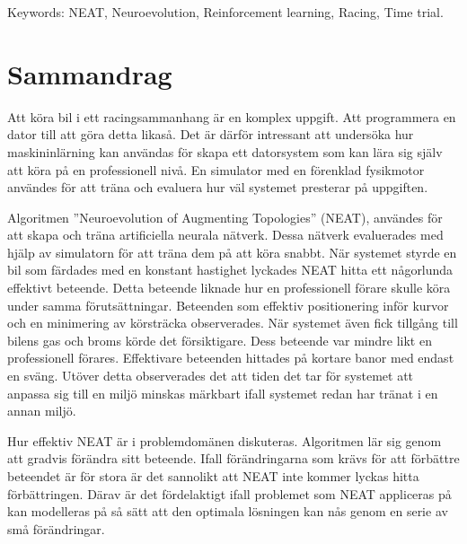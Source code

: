 \vfill
Keywords: NEAT, Neuroevolution, Reinforcement learning, Racing, Time trial.

\newpage				%
\thispagestyle{empty}
\mbox{}

\newpage
\thispagestyle{empty}
\section*{\centering Sammandrag}
Att köra bil i ett racingsammanhang är en komplex uppgift. Att programmera en dator till att göra detta likaså. Det är därför intressant att undersöka hur maskininlärning kan användas för skapa ett datorsystem som kan lära sig själv att köra på en professionell nivå. En simulator med en förenklad fysikmotor användes för att träna och evaluera hur väl systemet presterar på uppgiften. 

Algoritmen ”Neuroevolution of Augmenting Topologies” (NEAT), användes för att skapa och träna artificiella neurala nätverk. Dessa nätverk evaluerades med hjälp av simulatorn för att träna dem på att köra snabbt. När systemet styrde en bil som färdades med en konstant hastighet lyckades NEAT hitta ett någorlunda effektivt beteende. Detta beteende liknade hur en professionell förare skulle köra under samma förutsättningar. Beteenden som effektiv positionering inför kurvor och en minimering av körsträcka observerades. När systemet även fick tillgång till bilens gas och broms körde det försiktigare. Dess beteende var mindre likt en professionell förares. Effektivare beteenden hittades på kortare banor med endast en sväng. Utöver detta observerades det att tiden det tar för systemet att anpassa sig till en miljö minskas märkbart ifall systemet redan har tränat i en annan miljö. 

Hur effektiv NEAT är i problemdomänen diskuteras. Algoritmen lär sig genom att gradvis förändra sitt beteende. Ifall förändringarna som krävs för att förbättre beteendet är för stora är det sannolikt att NEAT inte kommer lyckas hitta förbättringen. Därav är det fördelaktigt ifall problemet som NEAT appliceras på kan modelleras på så sätt att den optimala lösningen kan nås genom en serie av små förändringar. 





\newpage				%
\thispagestyle{empty}
\mbox{}


